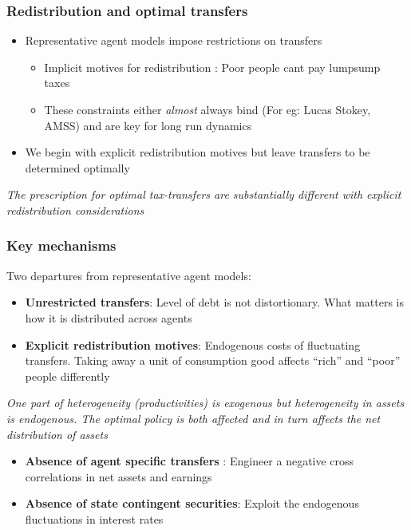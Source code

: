 \documentclass{beamer}
\begin{document}
 \begin{frame}
 \frametitle{Redistribution and optimal transfers}
 \begin{itemize}
  \item Representative agent models impose restrictions on transfers
  \begin{itemize}
 \item Implicit motives for redistribution :  Poor people cant pay lumpsump taxes
  \item These constraints either \emph{almost} always bind (For eg: Lucas Stokey, AMSS) and are key for long run dynamics
  \end{itemize}
\item We begin with explicit redistribution motives but leave transfers to be determined optimally
 \end{itemize}

 \vspace{4mm}
 \color{red}\emph{The prescription for optimal tax-transfers are substantially different with explicit redistribution considerations}
 \end{frame}
 



\begin{frame}
\frametitle{Key mechanisms}
Two departures from representative agent models:
\begin{itemize}
\item \textbf{Unrestricted transfers}: Level of debt is not distortionary. What matters is how it is distributed across agents
 \item \textbf{Explicit redistribution motives}: Endogenous costs of fluctuating transfers. Taking away a unit of consumption good affects ``rich'' and ``poor'' people differently
 \end{itemize}

\emph{One part of heterogeneity (productivities) is exogenous but heterogeneity in assets is endogenous. The optimal policy is both affected and in turn affects the net distribution of assets}

 \begin{itemize}
\item \textbf{Absence of agent specific transfers} : Engineer  a negative cross correlations in net assets and earnings
\item \textbf{Absence of state contingent securities}: Exploit the endogenous fluctuations in interest rates
\end{itemize}

\end{frame}
\end{document}
